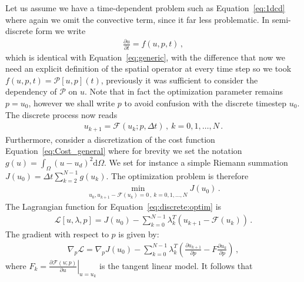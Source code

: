 \documentclass[10pt]{article}
\renewcommand{\d}{\mathrm{d}}
\newcommand{\dt}{\Delta t}
\newcommand{\CostFcn}{J}
\newcommand{\param}{p}
\newcommand{\ModelN}{{\mathcal{F}}}
\newcommand{\ModelTLM}{F}
\newcommand{\Lagrangian}{{\mathcal{L}}}
\begin{document}
Let us assume we have a time-dependent problem such as Equation~\ref{eq:1dcd} where again we omit the convective term, since it far less problematic. In semi-discrete form we write
%
\begin{align}
  \label{eq:semi:discrete:form}
\frac{\partial u}{\partial t} = f(u,p,t)\,, 
\end{align}
which is identical with Equation~\ref{eq:generic}, with the difference that now we need an explicit definition of the spatial operator at every time step so we took $f(u,p,t)=\mathcal P[u,p](t)$, previously it was sufficient to consider the dependency of $\mathcal P$ on $u$. Note that in fact the optimization parameter remains $\param=u_0$, however we shall write $p$ to avoid confusion with the discrete timestep $u_0$. 
The discrete process now reads
%
\begin{align}
   \label{eq:discrete:form}
u_{k+1} = \ModelN(u_{k};\param,\dt)\,,~ k=0,1,\dots, N\,.
\end{align}
%
Furthermore, consider a discretization of the cost function
Equation~\ref{eq:Cost_general} where for brevity we set the notation $g(u)=\int_{\Omega} (u-u_d)^2 \d \Omega$. We set for instance a simple Riemann summation
$\CostFcn(u_0) = \dt\sum_{k=2}^{N-1}  g(u_k)$. The optimization problem is therefore
%
\begin{align}
  \label{eq:discrete:optim}
\min_{u_0,u_{k+1} - \ModelN(u_{k})=0\,,~ k=0,1,\dots, N} \CostFcn(u_0)\,.
\end{align}
%
The Lagrangian function for Equation~\ref{eq:discrete:optim} is
%
\begin{align}
  \nonumber
\Lagrangian[u,\lambda,p] = \CostFcn(u_0) - \sum_{k=0}^{N-1} \lambda_k^T
\left(u_{k+1} - \ModelN(u_{k})\right)\,. 
\end{align}
%
The gradient with respect to $\param$ is given by:
%
\begin{align}
  \nonumber
\nabla_\param\Lagrangian =\nabla_\param \CostFcn(u_0) - \sum_{k=0}^{N-1}
\lambda_k^T \left(\frac{\partial u_{k+1}}{\partial \param} - \ModelTLM
\frac{\partial u_{k}}{\partial \param}\right)\,,
\end{align}
%
where $\ModelTLM_k = \left. \frac{\partial \ModelN(u;\param)}{\partial
  u}\right|_{u=u_k}$ is the tangent linear model. It follows that
%
\end{document}
